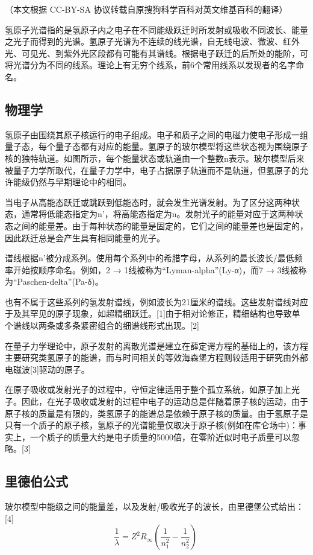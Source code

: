
（本文根据 CC-BY-SA 协议转载自原搜狗科学百科对英文维基百科的翻译）

氢原子光谱指的是氢原子内之电子在不同能级跃迁时所发射或吸收不同波长、能量之光子而得到的光谱。氢原子光谱为不连续的线光谱，自无线电波、微波、红外光、可见光、到紫外光区段都有可能有其谱线。根据电子跃迁的后所处的能阶，可将光谱分为不同的线系。理论上有无穷个线系，前6个常用线系以发现者的名字命名。

\subsection{物理学}
氢原子由围绕其原子核运行的电子组成。电子和质子之间的电磁力使电子形成一组量子态，每个量子态都有对应的能量。氢原子的玻尔模型将这些状态视为围绕原子核的独特轨道。如图所示，每个能量状态或轨道由一个整数n表示。玻尔模型后来被量子力学所取代，在量子力学中，电子占据原子轨道而不是轨道，但氢原子的允许能级仍然与早期理论中的相同。

当电子从高能态跃迁或跳跃到低能态时，就会发生光谱发射。为了区分这两种状态，通常将低能态指定为n’，将高能态指定为n。发射光子的能量对应于这两种状态之间的能量差。由于每种状态的能量是固定的，它们之间的能量差也是固定的，因此跃迁总是会产生具有相同能量的光子。

谱线根据n’被分成系列。使用每个系列中的希腊字母，从系列的最长波长/最低频率开始按顺序命名。例如，2 → 1线被称为“Lyman-alpha”(Ly-α)，而7 → 3线被称为“Paschen-delta”(Pa-δ)。

也有不属于这些系列的氢发射谱线，例如波长为21厘米的谱线。这些发射谱线对应于及其罕见的原子现象，如超精细跃迁。[1]由于相对论修正，精细结构也导致单个谱线以两条或多条紧密组合的细谱线形式出现。[2]

在量子力学理论中，原子发射的离散光谱是建立在薛定谔方程的基础上的，该方程主要研究类氢原子的能谱，而与时间相关的等效海森堡方程则较适用于研究由外部电磁波[3]驱动的原子。

在原子吸收或发射光子的过程中，守恒定律适用于整个孤立系统，如原子加上光子。因此，在光子吸收或发射的过程中电子的运动总是伴随着原子核的运动，由于原子核的质量是有限的，类氢原子的能谱总是依赖于原子核的质量。由于氢原子是只有一个质子的原子核，氢原子的光谱能量仅取决于原子核(例如在库仑场中)：事实上，一个质子的质量大约是电子质量的5000倍，在零阶近似时电子质量可以忽略。[3]

\subsection{里德伯公式}
玻尔模型中能级之间的能量差，以及发射/吸收光子的波长，由里德堡公式给出：[4]
\begin{equation}
\frac{1}{\lambda}=Z^2 R_{\infty}(\frac{1}{n_1^2}-\frac{1}{n_2^2})~
\end{equation}

